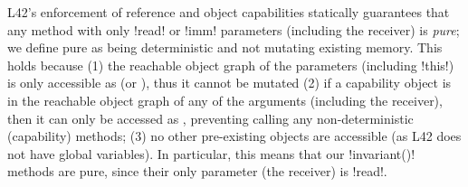 \label{s:purity}
L42's enforcement of reference and object capabilities statically guarantees that any method with only \Q!read! or \Q!imm! parameters (including the receiver) is \emph{pure}; we define pure
as being deterministic and not mutating existing memory. This holds because
(1) the reachable object graph of the parameters (including \Q!this!) is only accessible as \Q@read@ (or \Q@imm@), thus it cannot be mutated
(2) if a capability object is in the reachable object graph of any of the arguments (including the receiver), then it can only be accessed as \Q@read@, preventing calling any 
non-deterministic (capability) methods;
(3) no other pre-existing objects are accessible (as L42 does not have global variables). 
In particular, this means that our \Q!invariant()! methods are pure, since 
their only parameter (the receiver) is \Q!read!.



